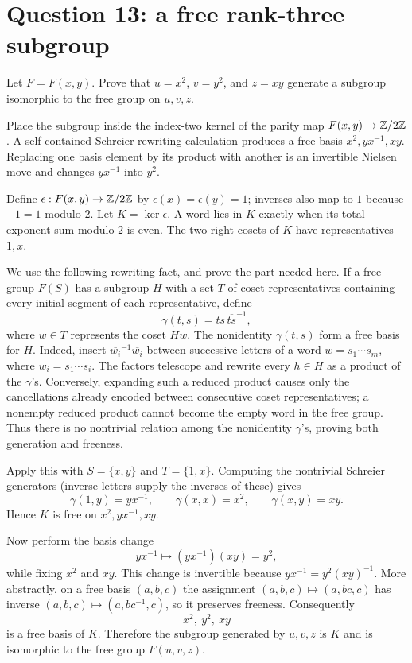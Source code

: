 \documentclass[11pt,openany]{book}
\begin{document}
\section{Question 13: a free rank-three subgroup}
\begin{questionbox}
Let $F=F(x,y)$. Prove that $u=x^2$, $v=y^2$, and $z=xy$ generate a subgroup isomorphic to the free group on $u,v,z$.
\end{questionbox}
\begin{approachbox}
Place the subgroup inside the index-two kernel of the parity map $F(x,y)\to\mathbb Z/2\mathbb Z$. A self-contained Schreier rewriting calculation produces a free basis $x^2,yx^{-1},xy$. Replacing one basis element by its product with another is an invertible Nielsen move and changes $yx^{-1}$ into $y^2$.
\end{approachbox}
\begin{solutionbox}
Define $\epsilon:F(x,y)\to\mathbb Z/2\mathbb Z$ by $\epsilon(x)=\epsilon(y)=1$; inverses also map to $1$ because $-1=1$ modulo $2$. Let $K=\ker\epsilon$. A word lies in $K$ exactly when its total exponent sum modulo $2$ is even. The two right cosets of $K$ have representatives $1,x$.

We use the following rewriting fact, and prove the part needed here. If a free group $F(S)$ has a subgroup $H$ with a set $T$ of coset representatives containing every initial segment of each representative, define
\[
\gamma(t,s)=ts\,\overline{ts}^{-1},
\]
where $\overline{w}\in T$ represents the coset $Hw$. The nonidentity $\gamma(t,s)$ form a free basis for $H$. Indeed, insert
$\overline{w_i}^{-1}\overline{w_i}$ between successive letters of a word $w=s_1\cdots s_m$, where $w_i=s_1\cdots s_i$. The factors telescope and rewrite every $h\in H$ as a product of the $\gamma$'s. Conversely, expanding such a reduced product causes only the cancellations already encoded between consecutive coset representatives; a nonempty reduced product cannot become the empty word in the free group. Thus there is no nontrivial relation among the nonidentity $\gamma$'s, proving both generation and freeness.

Apply this with $S=\{x,y\}$ and $T=\{1,x\}$. Computing the nontrivial Schreier generators (inverse letters supply the inverses of these) gives
\[
\gamma(1,y)=yx^{-1},\qquad
\gamma(x,x)=x^2,\qquad
\gamma(x,y)=xy.
\]
Hence $K$ is free on $x^2,yx^{-1},xy$.

Now perform the basis change
\[
yx^{-1}\longmapsto (yx^{-1})(xy)=y^2,
\]
while fixing $x^2$ and $xy$. This change is invertible because
$yx^{-1}=y^2(xy)^{-1}$. More abstractly, on a free basis $(a,b,c)$ the assignment $(a,b,c)\mapsto(a,bc,c)$ has inverse $(a,b,c)\mapsto(a,bc^{-1},c)$, so it preserves freeness. Consequently
\[
x^2,\ y^2,\ xy
\]
is a free basis of $K$. Therefore the subgroup generated by $u,v,z$ is $K$ and is isomorphic to the free group $F(u,v,z)$.
\end{solutionbox}
\end{document}
